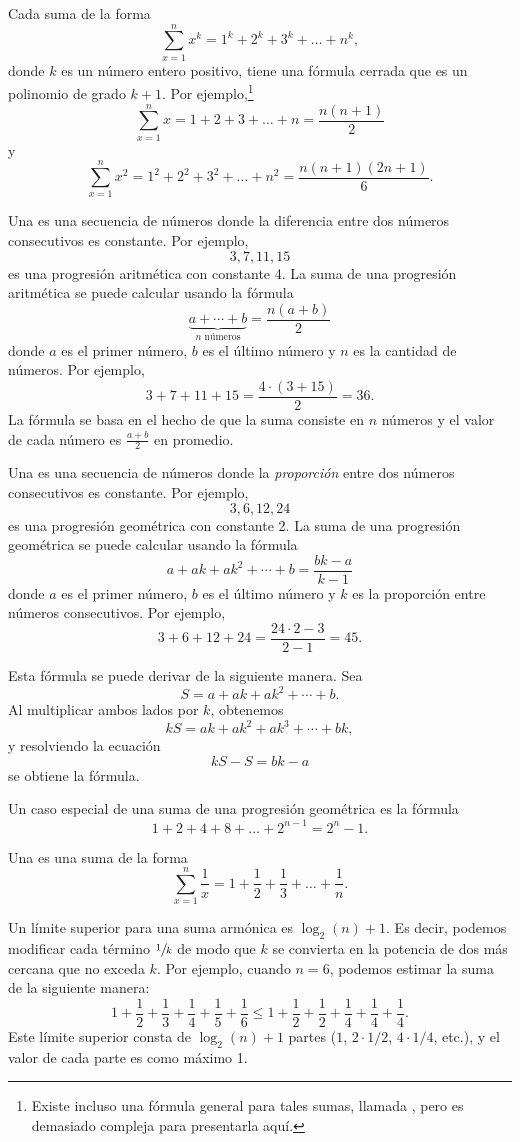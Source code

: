 Cada suma de la forma
\[\sum_{x=1}^n x^k = 1^k+2^k+3^k+\ldots+n^k,\]
donde $k$ es un número entero positivo,
tiene una fórmula cerrada que es un
polinomio de grado $k+1$.
Por ejemplo,\footnote{
Existe incluso una fórmula general para tales sumas, llamada ,
pero es demasiado compleja para presentarla aquí.}
\[\sum_{x=1}^n x = 1+2+3+\ldots+n = \frac{n(n+1)}{2}\]
y
\[\sum_{x=1}^n x^2 = 1^2+2^2+3^2+\ldots+n^2 = \frac{n(n+1)(2n+1)}{6}.\]

Una  es una
secuencia de números donde la diferencia
entre dos números consecutivos
es constante. Por ejemplo,
\[3, 7, 11, 15\]
es una progresión aritmética con constante 4.
La suma de una progresión aritmética se puede calcular
usando la fórmula
\[\underbrace{a + \cdots + b}_{n \,\, \textrm{números}} = \frac{n(a+b)}{2}\]
donde $a$ es el primer número,
$b$ es el último número y
$n$ es la cantidad de números.
Por ejemplo,
\[3+7+11+15=\frac{4 \cdot (3+15)}{2} = 36.\]
La fórmula se basa en el hecho
de que la suma consiste en $n$ números y
el valor de cada número es $\frac{a+b}{2}$ en promedio.

Una  es una secuencia
de números donde la \emph{proporción} entre dos números consecutivos
es constante. Por ejemplo,
\[3,6,12,24\]
es una progresión geométrica con constante 2.
La suma de una progresión geométrica se puede calcular
usando la fórmula
\[a + ak + ak^2 + \cdots + b = \frac{bk-a}{k-1}\]
donde $a$ es el primer número,
$b$ es el último número y $k$ es la
proporción entre números consecutivos.
Por ejemplo,
\[3+6+12+24=\frac{24 \cdot 2 - 3}{2-1} = 45.\]

Esta fórmula se puede derivar de la siguiente manera. Sea
\[ S = a + ak + ak^2 + \cdots + b .\]
Al multiplicar ambos lados por $k$, obtenemos
\[ kS = ak + ak^2 + ak^3 + \cdots + bk,\]
y resolviendo la ecuación
\[ kS-S = bk-a\]
se obtiene la fórmula.

Un caso especial de una suma de una progresión geométrica es la fórmula
\[1+2+4+8+\ldots+2^{n-1}=2^n-1.\]


Una  es una suma de la forma
\[ \sum_{x=1}^n \frac{1}{x} = 1+\frac{1}{2}+\frac{1}{3}+\ldots+\frac{1}{n}.\]

Un límite superior para una suma armónica es $\log_2(n)+1$.
Es decir, podemos
modificar cada término $\sfrac{1}{k}$ de modo que $k$ se convierta
en la potencia de dos más cercana que no exceda $k$.
Por ejemplo, cuando $n=6$, podemos estimar
la suma de la siguiente manera:
\[ 1+\frac{1}{2}+\frac{1}{3}+\frac{1}{4}+\frac{1}{5}+\frac{1}{6} \le
1+\frac{1}{2}+\frac{1}{2}+\frac{1}{4}+\frac{1}{4}+\frac{1}{4}.\]
Este límite superior consta de $\log_2(n)+1$ partes
($1$, $2 \cdot 1/2$, $4 \cdot 1/4$, etc.),
y el valor de cada parte es como máximo 1.

